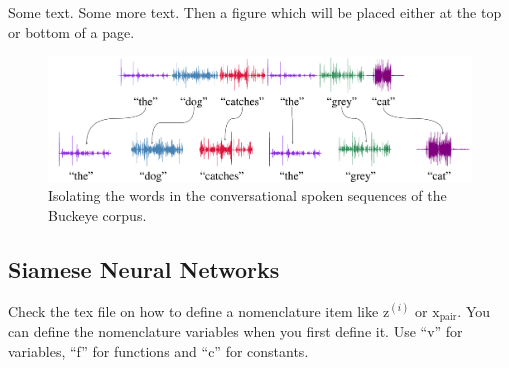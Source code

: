 \graphicspath{{figures/}}

\label{sec:unimodal_few-shot_learning}

Some text. 
Some more text.
Then a figure which will be placed either at the top or bottom of a page.

\begin{figure}[tb]
	
	\begin{minipage}[htb!]{1.0\textwidth}
		\centering
		\includegraphics[width=\textwidth]{buckeye_cropped.pdf}
	\end{minipage}
	\caption{Isolating the words in the conversational spoken sequences of the Buckeye corpus.}
	\label{fig:buckeye}
	
\end{figure}

\subsection[Siamese neural networks]{Siamese Neural Networks}
\label{sec:siamese}

Check the tex file on how to define a nomenclature item like $\boldsymbol{\mathrm{z}}^{(i)}$  or $\boldsymbol{\mathrm{x}}_{\textrm{pair}}$.
You can define the nomenclature variables when you first define it. Use ``v'' for variables, ``f'' for functions and ``c'' for constants.

